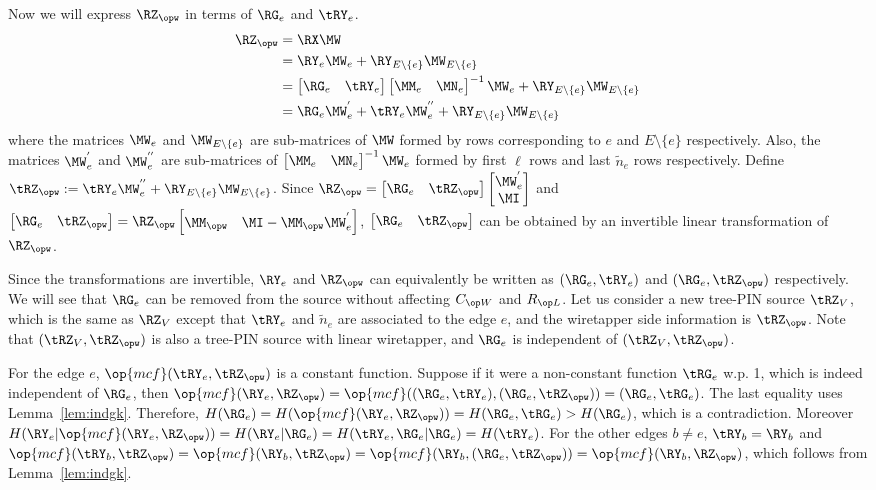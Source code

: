 Now we will express $\RZ_{\opw}$ in terms of  $\RG_e$ and $\tRY_e$.
\begin{align*}
 \RZ_{\opw} &= \RX \MW\\
 & =\RY_e\MW_e + \RY_{E \setminus \{e\}} \MW_{E \setminus \{e\}}\\
 &= \bM \RG_e & \tRY_e\eM\bM \MM_e & \MN_e \eM^{-1}\MW_e + \RY_{E \setminus \{e\}} \MW_{E \setminus \{e\}}\\
 &= \RG_e \MW^{'}_e +\tRY_e \MW^{''}_e + \RY_{E \setminus \{e\}} \MW_{E \setminus \{e\}}
\end{align*}
where the  matrices $\MW_e$ and $\MW_{E \setminus \{e\}}$ are sub-matrices  of $\MW$ formed by rows corresponding to $e$ and $E \setminus \{e\}$ respectively. Also, the matrices $\MW^{'}_e$ and $\MW^{''}_e$ are sub-matrices  of $\bM \MM_e &  \MN_e \eM^{-1}\MW_e$ formed  by first $\ell$ rows and last $\tilde{n}_e$ rows respectively. Define $\tRZ_{\opw}:=\tRY_e \MW^{''}_e + \RY_{E \setminus \{e\}} \MW_{E \setminus \{e\}}$. Since $\RZ_{\opw}= \bM\RG_e & \tRZ_{\opw}\eM\bM  \MW^{'}_e \\ \MI \eM$ and $\bM\RG_e & \tRZ_{\opw}\eM = \RZ_{\opw}\bM \MM_{\opw} & \MI -\MM_{\opw}\MW^{'}_e \eM$, $\bM \RG_e & \tRZ_{\opw} \eM$ can be obtained by an invertible linear transformation of $\RZ_{\opw}$.

Since the transformations are invertible, $\RY_e$ and $\RZ_{\opw}$ can equivalently be written as $(\RG_e, \tRY_e)$ and $(\RG_e, \tRZ_{\opw} )$ respectively. We will see that $\RG_e$ can be removed from the source without affecting $\wskc$ and $\rl$.  Let us consider a  new tree-PIN  source $\tRZ_V$, which is the same as $\RZ_V$ except that  $\tRY_e$ and $\tilde{n}_e$ are associated to the edge $e$, and the wiretapper side information is  $\tRZ_{\opw}$. Note that $(\tRZ_V, \tRZ_{\opw})$ is also a tree-PIN source with linear wiretapper, and $\RG_e$ is independent of $(\tRZ_V, \tRZ_{\opw})$.

 For the edge $e$, $\op{mcf}(\tRY_e, \tRZ_{\opw})$ is a  constant function. Suppose if it were a non-constant function $\tRG_e$ w.p. 1, which  is indeed independent of $\RG_e$, then $\op{mcf}(\RY_e, \RZ_{\opw}) = \op{mcf}((\RG_e, \tRY_e), (\RG_e,\tRZ_{\opw}))= (\RG_e, \tRG_e)$. The last equality uses Lemma~\ref{lem:indgk}. Therefore, $H(\RG_e) =H(\op{mcf}(\RY_e, \RZ_{\opw}))=H(\RG_e, \tRG_e) >  H(\RG_e)$, which is a contradiction.  Moreover $H(\RY_e|\op{mcf}(\RY_e, \RZ_{\opw}))= H(\RY_e|\RG_e) =H(\tRY_e, \RG_e|\RG_e) = H(\tRY_e)$. For the other edges $b \neq e$, $\tRY_b = \RY_b$ and $\op{mcf}(\tRY_b,\tRZ_{\opw})= \op{mcf}(\RY_b,\tRZ_{\opw})= \op{mcf}(\RY_b, (\RG_e,\tRZ_{\opw})) = \op{mcf}(\RY_b, \RZ_{\opw})$, which follows from Lemma~\ref{lem:indgk}.
 
